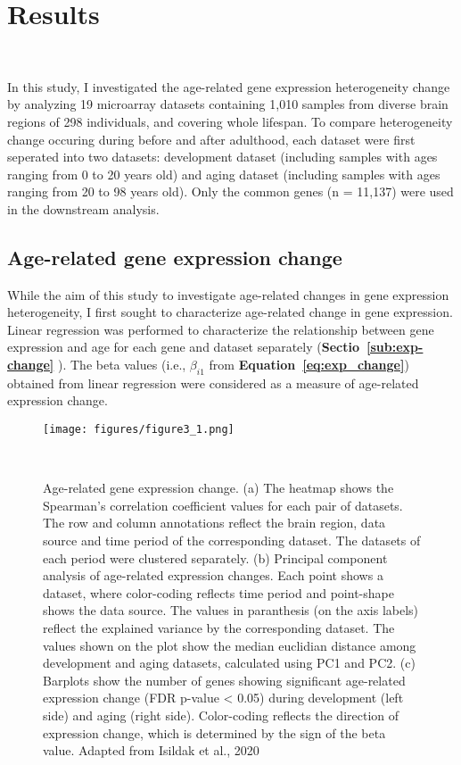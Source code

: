 \chapter{Results}~\label{chp:b3}

In this study, I investigated the age-related gene expression heterogeneity change by analyzing 19 microarray datasets
containing 1,010 samples from diverse brain regions of 298 individuals, and covering whole lifespan.
To compare heterogeneity change occuring during before and after adulthood, each dataset were first seperated into two datasets: development dataset 
(including samples with ages ranging from 0 to 20 years old) and aging dataset (including samples with ages ranging from 20 to 98 years old).
Only the common genes (n = 11,137) were used in the downstream analysis.

\section{Age-related gene expression change}
While the aim of this study to investigate age-related changes in gene expression heterogeneity, I first sought to characterize age-related change in gene expression.
Linear regression was performed to characterize the relationship between gene expression and age for each gene and dataset separately (\textbf{Sectio~\ref{sub:exp-change}} ).
The beta values (i.e., $\beta_{i1}$ from \textbf{Equation~\ref{eq:exp_change}}) obtained from linear regression were considered as a measure of age-related expression change.

\begin{figure}[h]
    \centering
    \texttt{[image: figures/figure3\_1.png]}
    \caption{Age-related gene expression change. 
    (a) The heatmap shows the Spearman's correlation coefficient values for each pair of datasets.
    The row and column annotations reflect the brain region, data source and time period of the corresponding dataset.
    The datasets of each period were clustered separately.
    (b) Principal component analysis of age-related expression changes. Each point shows a dataset, 
    where color-coding reflects time period and point-shape shows the data source. 
    The values in paranthesis (on the axis labels) reflect the explained variance by the corresponding dataset.
    The values shown on the plot show the median euclidian distance among development and aging datasets, 
    calculated using PC1 and PC2.
    (c) Barplots show the number of genes showing significant age-related expression change (FDR p-value < 0.05) during development (left side) and aging (right side).
    Color-coding reflects the direction of expression change, which is determined by the sign of the beta value.
    Adapted from Isildak et al., 2020
    }~\label{fig:fig3.1}
\end{figure}

